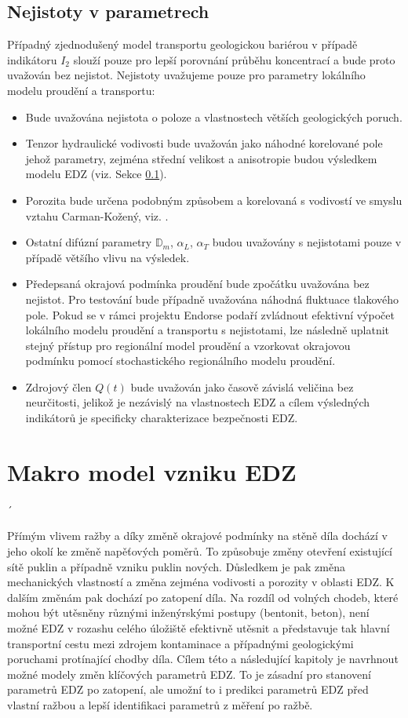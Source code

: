 \documentclass{article}
\def\tn#1{{\mathbb{#1}}}    %
\begin{document}
\subsection{Nejistoty v parametrech}
Případný zjednodušený model transportu geologickou bariérou v případě indikátoru $I_2$ slouží pouze pro lepší porovnání průběhu koncentrací a bude proto uvažován bez nejistot. Nejistoty uvažujeme pouze pro parametry lokálního modelu proudění a transportu:
\begin{itemize}
 \item Bude uvažována nejistota o poloze a vlastnostech větších geologických poruch.
 \item Tenzor hydraulické vodivosti bude uvažován jako náhodné korelované pole jehož parametry, zejména střední velikost a anisotropie budou 
 výsledkem modelu EDZ (viz. Sekce \ref{}).
 \item Porozita bude určena podobným způsobem a korelovaná s vodivostí ve smyslu vztahu Carman-Kožený, viz. \cite{Carrier2003}.
 \item Ostatní difúzní parametry $\tn D_m$, $\alpha_L$, $\alpha_T$ budou uvažovány s nejistotami pouze v případě většího vlivu na výsledek.
 \item Předepsaná okrajová podmínka proudění bude zpočátku uvažována bez nejistot. Pro testování bude případně uvažována náhodná fluktuace tlakového pole. Pokud se v rámci projektu Endorse podaří zvládnout efektivní výpočet lokálního modelu proudění a transportu s nejistotami, lze následně uplatnit stejný přístup pro regionální model proudění a vzorkovat okrajovou podmínku pomocí stochastického regionálního modelu proudění.
 \item Zdrojový člen $Q(t)$ bude uvažován jako časově závislá veličina bez neurčitosti, jelikož 
 je nezávislý na vlastnostech EDZ a cílem výsledných indikátorů je specificky charakterizace bezpečnosti EDZ.
\end{itemize}

\section{Makro model vzniku EDZ}
\label{sec:model_EDZ}´

Přímým vlivem ražby a díky změně okrajové podmínky na stěně díla dochází v jeho okolí ke změně napěťových poměrů. To způsobuje změny otevření 
existující sítě puklin a případně vzniku puklin nových. Důsledkem je pak změna mechanických vlastností a změna zejména vodivosti a 
porozity v oblasti EDZ. K dalším změnám pak dochází po zatopení díla. Na rozdíl od volných chodeb, které mohou být utěsněny různými inženýrskými postupy (bentonit, beton), není možné EDZ v rozashu celého úložiště efektivně utěsnit a představuje tak hlavní transportní cestu mezi zdrojem kontaminace 
a případnými geologickými poruchami protínající chodby díla. 
Cílem této a následující kapitoly je navrhnout možné modely změn klíčových parametrů EDZ. To je zásadní pro stanovení parametrů EDZ po zatopení, ale
umožní to i predikci parametrů EDZ před vlastní ražbou a lepší identifikaci parametrů z měření po ražbě.
\end{document}

